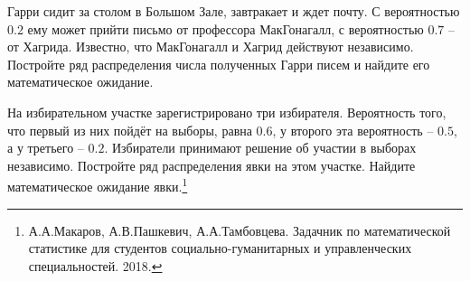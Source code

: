 \documentclass[a4paper, 12pt]{article}
\begin{document}
\begin{problem}
Гарри сидит за столом в Большом Зале, завтракает и ждет почту. 
С вероятностью $0.2$ ему может прийти письмо от профессора МакГонагалл, 
с вероятностью $0.7$ -- от Хагрида. Известно, что МакГонагалл и Хагрид 
действуют независимо. Постройте ряд распределения числа полученных Гарри 
писем и найдите его  математическое ожидание.
\end{problem}

\begin{problem}
На избирательном участке зарегистрировано три избирателя. Вероятность того, что первый
из них пойдёт на выборы, равна $0.6$, у второго эта вероятность -- $0.5$, 
а у третьего -- $0.2$. Избиратели принимают решение об участии в выборах независимо.
Постройте ряд распределения явки на этом участке. Найдите математическое ожидание явки.\footnote{
А.А.Макаров, А.В.Пашкевич, А.А.Тамбовцева. Задачник по математической статистике для студентов социально-гуманитарных и управленческих специальностей. 2018.}
\end{problem}
\end{document}
